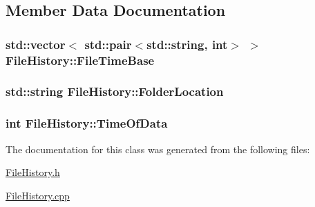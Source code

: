 \subsection{Member Data Documentation}
\hypertarget{classFileHistory_ac4ce01b2c30fedd241d93107f34c3750}{
\subsubsection[{File\-Time\-Base}]{\setlength{\rightskip}{0pt plus 5cm}std\-::vector$<$ std\-::pair$<$std\-::string, int$>$ $>$ File\-History\-::\-File\-Time\-Base\hspace{0.3cm}{\ttfamily [private]}}}\label{classFileHistory_ac4ce01b2c30fedd241d93107f34c3750}
\hypertarget{classFileHistory_a4ed9b51579a45e657ba6e1dbb4d2e7a7}{
\subsubsection[{Folder\-Location}]{\setlength{\rightskip}{0pt plus 5cm}std\-::string File\-History\-::\-Folder\-Location\hspace{0.3cm}{\ttfamily [private]}}}\label{classFileHistory_a4ed9b51579a45e657ba6e1dbb4d2e7a7}
\hypertarget{classFileHistory_ac054d9b23889c2d64faebfbb67bcf444}{
\subsubsection[{Time\-Of\-Data}]{\setlength{\rightskip}{0pt plus 5cm}int File\-History\-::\-Time\-Of\-Data\hspace{0.3cm}{\ttfamily [private]}}}\label{classFileHistory_ac054d9b23889c2d64faebfbb67bcf444}


The documentation for this class was generated from the following files\-:\begin{DoxyCompactItemize}
\item 
\hyperlink{FileHistory_8h}{File\-History.\-h}\item 
\hyperlink{FileHistory_8cpp}{File\-History.\-cpp}\end{DoxyCompactItemize}
